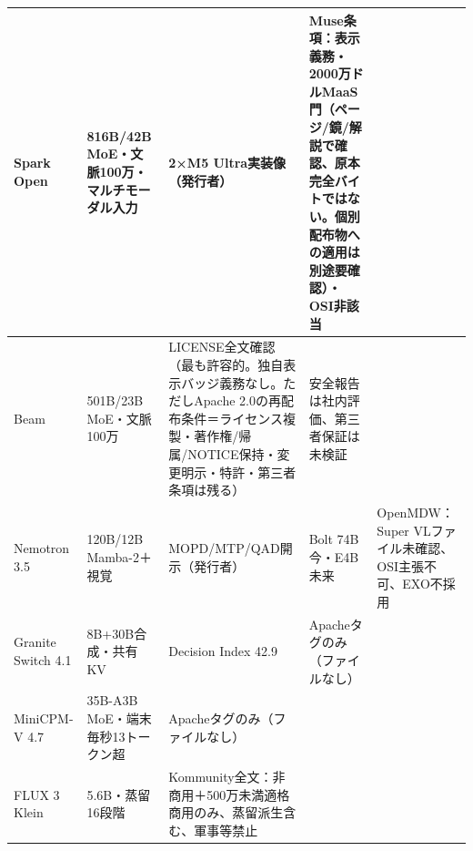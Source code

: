 \documentclass[lualatex,a4paper,10pt]{jlreq}
\begin{document}
{\centering\footnotesize
{}
\begin{tabularx}{0.96\linewidth}{@{}lXXXX@{}}
\toprule
Spark Open & 816B/42B MoE・文脈100万・マルチモーダル入力 & 2×M5 Ultra実装像（発行者） & Muse条項：表示義務・2000万ドルMaaS門（ページ/鏡/解説で確認、原本完全バイトではない。個別配布物への適用は別途要確認）・OSI非該当 \cite{B14,B70,B15,B13} \\
\midrule
Beam & 501B/23B MoE・文脈100万 & LICENSE全文確認（最も許容的。独自表示バッジ義務なし。ただしApache 2.0の再配布条件＝ライセンス複製・著作権/帰属/NOTICE保持・変更明示・特許・第三者条項は残る） & 安全報告は社内評価、第三者保証は未検証 \cite{B17,B19,B18,B16} \\
\midrule
Nemotron 3.5 & 120B/12B Mamba-2＋視覚 & MOPD/MTP/QAD開示（発行者） & Bolt 74B今・E4B未来 & OpenMDW：Super VLファイル未確認、OSI主張不可、EXO不採用 \cite{B21,B72,B22,B20} \\
\midrule
Granite Switch 4.1 & 8B+30B合成・共有KV & Decision Index 42.9 & Apacheタグのみ（ファイルなし） \cite{B24,B73,B23,B25} \\
\midrule
MiniCPM-V 4.7 & 35B-A3B MoE・端末毎秒13トークン超 & Apacheタグのみ（ファイルなし） \cite{B27,B74,B26} \\
\midrule
FLUX 3 Klein & 5.6B・蒸留16段階 & Kommunity全文：非商用＋500万未満適格商用のみ、蒸留派生含む、軍事等禁止 \cite{B29,B28,B30} \\
\bottomrule
\end{tabularx}
} %
\end{document}
